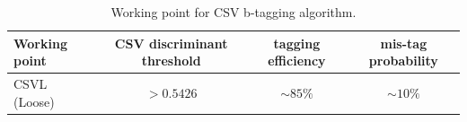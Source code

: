  
% 

\begin{table}[!htb]
  \centering
  \label{tab:btag}
  \begin{tabular}{l|ccc}
     Working point & CSV discriminant threshold & tagging efficiency & mis-tag probability\\ 
    \hline
 \hline
     CSVL (Loose)  & $>0.5426$ & $\sim85\%$ & $\sim 10\%$  \\ 
  \end{tabular}
  \caption{Working point for CSV b-tagging algorithm.}
  
\end{table}

